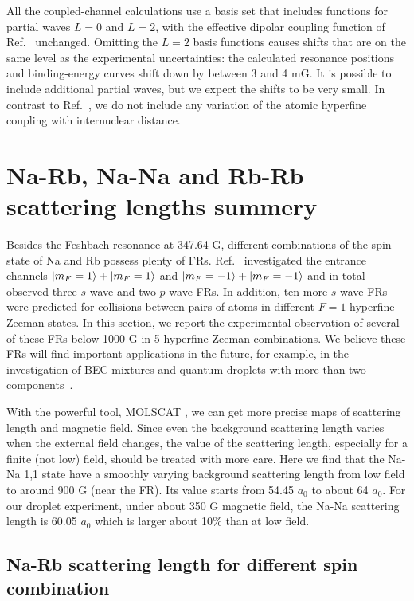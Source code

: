 All the coupled-channel calculations use a basis set that includes functions for partial waves $L = 0$ and $L =2$, with the effective dipolar coupling function of Ref.\ \cite{wang2013observation} unchanged. Omitting the $L = 2$ basis functions causes shifts that are on the same level as the experimental uncertainties: the calculated resonance positions and binding-energy curves shift down by between 3 and 4 mG. It is possible to include additional partial waves, but we expect the shifts to be very small. In contrast to Ref.\ \cite{wang2013observation}, we do not include any variation of the atomic hyperfine coupling with internuclear distance.


\section{Na-Rb, Na-Na and Rb-Rb scattering lengths summery}
\label{sec:FR_spec_more}
Besides the Feshbach resonance at 347.64 G, different combinations of the spin state of Na and Rb possess plenty of FRs. Ref.~\cite{wang2013observation} investigated the entrance channels $\ket{m_F=1}+\ket{m_F=1}$ and $\ket{m_F=-1}+\ket{m_F=-1}$ and in total observed three $s$-wave and two $p$-wave FRs. In addition, ten more $s$-wave FRs were predicted for collisions between pairs of atoms in different $F = 1$ hyperfine Zeeman states. In this section, we report the experimental observation of several of these FRs below 1000 G in 5 hyperfine Zeeman combinations. We believe these FRs will find important applications in the future, for example, in the investigation of BEC mixtures and quantum droplets with more than two components~\cite{ma2021}. 

With the powerful tool, MOLSCAT \cite{molscat:2019,mbf-github:2020}, we can get more precise maps of scattering length and magnetic field. Since even the background scattering length varies when the external field changes, the value of the scattering length, especially for a finite (not low) field, should be treated with more care. Here we find that the Na-Na 1,1 state have a smoothly varying background scattering length from low field to around 900 G (near the FR). Its value starts from 54.45 $a_0$ to about 64 $a_0$. For our droplet experiment, under about 350 G magnetic field, the Na-Na scattering length is 60.05 $a_0$ which is larger about 10\% than at low field.

\subsection{Na-Rb scattering length for different spin combination}

